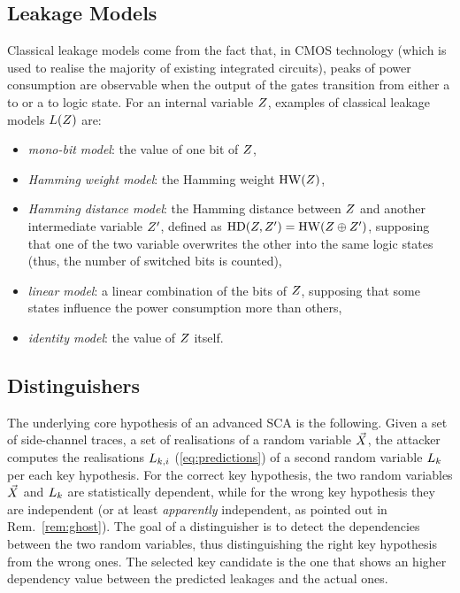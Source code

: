 \subsection{Leakage Models}\label{sec:leakage_models}
Classical leakage models come from the fact that, in CMOS technology (which is used to realise the majority of existing integrated circuits), peaks of power consumption are observable when the output of the gates transition from either a \textquotedbl to \textquotedbl or a \textquotedbl to \textquotedbl logic state.  For an internal variable $Z$, examples of classical leakage models $L(Z)$ are:
\begin{itemize}
\item \emph{mono-bit model}: the value of one bit of $Z$,
\item\emph{Hamming weight model}: the Hamming weight $\mathrm{HW}(Z)$,
\item \emph{Hamming distance model}: the Hamming distance between $Z$ and another intermediate variable $Z^\prime$, defined as $\mathrm{HD}(Z,Z^\prime) = \mathrm{HW}(Z\oplus Z^\prime)$, supposing \eg that one of the two variable overwrites the other into the same logic states (thus, the number of switched bits is counted),
\item \emph{linear model}: a linear combination of the bits of $Z$, supposing that some states influence the power consumption more than others, 
\item \emph{identity model}: the value of $Z$ itself.
\end{itemize} 

\subsection{Distinguishers}\label{sec:distinguishers}
The underlying core hypothesis of an advanced SCA is the following. Given a set of side-channel traces, \ie a set of realisations of a random variable $\vec{X}$, the attacker computes the realisations $L_{k,i}$ (\via \eqref{eq:predictions}) of a second random variable $L_k$ per each key hypothesis. For the correct key hypothesis, the two random variables $\vec{X}$ and $L_k$ are statistically dependent, while for the wrong key hypothesis they are independent (or at least \emph{apparently} independent, as pointed out in Rem.~\ref{rem:ghost}). The goal of a distinguisher is to detect the dependencies between the two random variables, thus distinguishing the right key hypothesis from the wrong ones. The selected key candidate is the one that shows an higher dependency value between the  predicted leakages and the actual ones. 

